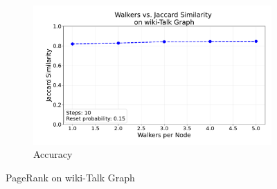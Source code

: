 \begin{figure}[H]
\begin{subfigure}[t]{0.5\linewidth}
        \includegraphics[width=\linewidth]{images/plots/wiki-Talk/accuracy_plots_wiki_talk.pdf}
        \caption{Accuracy}
        \label{fig:wikigibhrs}
    \end{subfigure}
    \caption{PageRank on wiki-Talk Graph}
    \label{fig:wiki-comparison}
\end{figure}

